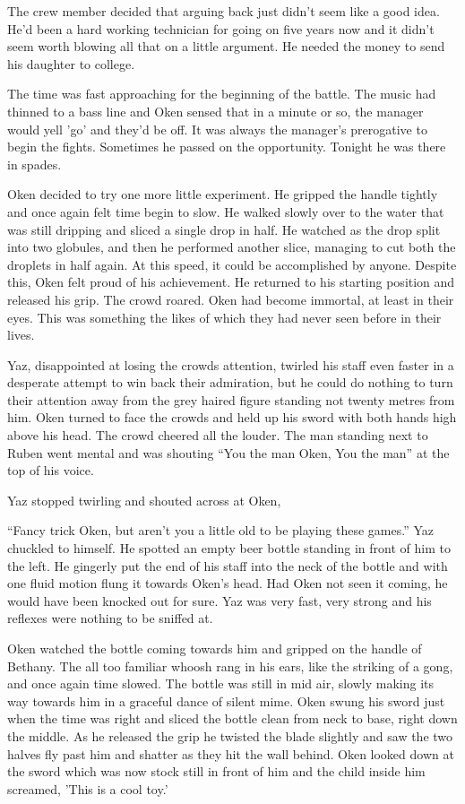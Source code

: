 The crew member decided that arguing back just didn't seem like a good idea. He'd been a hard working technician for going on five years now and it didn't seem worth blowing all that on a little argument. He needed the money to send his daughter to college.

The time was fast approaching for the beginning of the battle. The music had thinned to a bass line and Oken sensed that in a minute or so, the manager would yell 'go' and they'd be off. It was always the manager's prerogative to begin the fights. Sometimes he passed on the opportunity. Tonight he was there in spades.

Oken decided to try one more little experiment. He gripped the handle tightly and once again felt time begin to slow. He walked slowly over to the water that was still dripping and sliced a single drop in half. He watched as the drop split into two globules, and then he performed another slice, managing to cut both the droplets in half again. At this speed, it could be accomplished by anyone. Despite this, Oken felt proud of his achievement. He returned to his starting position and released his grip. The crowd roared. Oken had become immortal, at least in their eyes. This was something the likes of which they had never seen before in their lives.

Yaz, disappointed at losing the crowds attention, twirled his staff even faster in a desperate attempt to win back their admiration, but he could do nothing to turn their attention away from the grey haired figure standing not twenty metres from him. Oken turned to face the crowds and held up his sword with both hands high above his head. The crowd cheered all the louder. The man standing next to Ruben went mental and was shouting ``You the man Oken, You the man'' at the top of his voice.

Yaz stopped twirling and shouted across at Oken,

``Fancy trick Oken, but aren't you a little old to be playing these games.'' Yaz chuckled to himself. He spotted an empty beer bottle standing in front of him to the left. He gingerly put the end of his staff into the neck of the bottle and with one fluid motion flung it towards Oken's head. Had Oken not seen it coming, he would have been knocked out for sure. Yaz was very fast, very strong and his reflexes were nothing to be sniffed at.

Oken watched the bottle coming towards him and gripped on the handle of Bethany. The all too familiar whoosh rang in his ears, like the striking of a gong, and once again time slowed. The bottle was still in mid air, slowly making its way towards him in a graceful dance of silent mime. Oken swung his sword just when the time was right and sliced the bottle clean from neck to base, right down the middle. As he released the grip he twisted the blade slightly and saw the two halves fly past him and shatter as they hit the wall behind. Oken looked down at the sword which was now stock still in front of him and the child inside him screamed, 'This is a cool toy.'

